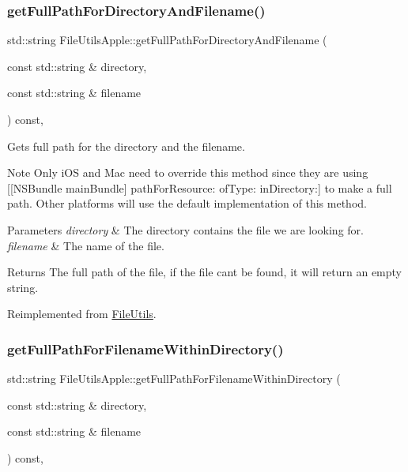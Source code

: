 \subsubsection{\texorpdfstring{get\+Full\+Path\+For\+Directory\+And\+Filename()}{getFullPathForDirectoryAndFilename()}}
{\footnotesize\ttfamily std\+::string File\+Utils\+Apple\+::get\+Full\+Path\+For\+Directory\+And\+Filename (\begin{DoxyParamCaption}\item[{const std\+::string \&}]{directory,  }\item[{const std\+::string \&}]{filename }\end{DoxyParamCaption}) const\hspace{0.3cm}{\ttfamily [override]}, {\ttfamily [virtual]}}

Gets full path for the directory and the filename.

\begin{DoxyNote}{Note}
Only i\+OS and Mac need to override this method since they are using {\ttfamily \mbox{[}\mbox{[}N\+S\+Bundle main\+Bundle\mbox{]} path\+For\+Resource\+: of\+Type\+: in\+Directory\+:\mbox{]}} to make a full path. Other platforms will use the default implementation of this method. 
\end{DoxyNote}

\begin{DoxyParams}{Parameters}
{\em directory} & The directory contains the file we are looking for. \\
\hline
{\em filename} & The name of the file. \\
\hline
\end{DoxyParams}
\begin{DoxyReturn}{Returns}
The full path of the file, if the file can\textquotesingle{}t be found, it will return an empty string. 
\end{DoxyReturn}


Reimplemented from \hyperlink{classFileUtils_a543d684dc27fc7d02fbe387271d92c12}{File\+Utils}.

\mbox{\label{classFileUtilsApple_aa05388c597ff89171e955808338de05e}} 
\subsubsection{\texorpdfstring{get\+Full\+Path\+For\+Filename\+Within\+Directory()}{getFullPathForFilenameWithinDirectory()}}
{\footnotesize\ttfamily std\+::string File\+Utils\+Apple\+::get\+Full\+Path\+For\+Filename\+Within\+Directory (\begin{DoxyParamCaption}\item[{const std\+::string \&}]{directory,  }\item[{const std\+::string \&}]{filename }\end{DoxyParamCaption}) const\hspace{0.3cm}{\ttfamily [override]}, {\ttfamily [virtual]}}

